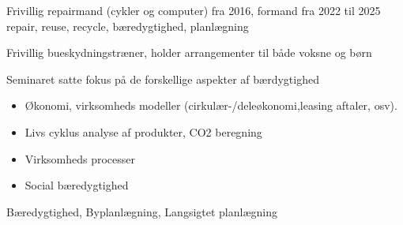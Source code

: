 %
%
%


\begin{projects}

{}
{Frivillig repairmand (cykler og computer) fra 2016, formand fra 2022 til 2025
}
{repair, reuse, recycle, bæredygtighed, planlægning}


{}
{Frivillig bueskydningstræner, holder arrangementer til både voksne og børn}
{}




{ }
{Seminaret satte fokus på de forskellige aspekter af bærdygtighed
\begin{itemize}
    	\item Økonomi, virksomheds modeller (cirkulær-/deleøkonomi,leasing aftaler, osv).
        \item Livs cyklus analyse af produkter, CO2 beregning
        \item Virksomheds processer
        \item Social bæredygtighed
        \end{itemize}
}
{Bæredygtighed, Byplanlægning, Langsigtet planlægning}



\end{projects}
